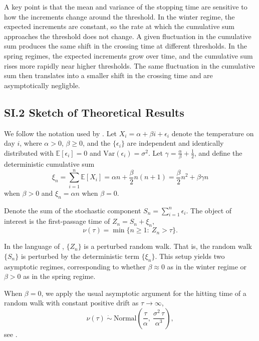\documentclass[12pt,letterpaper]{article}
\begin{document}
A key point is that the mean and variance of the stopping time are sensitive to how the increments change around the threshold. In the winter regime, the expected increments are constant, so the rate at which the cumulative sum approaches the threshold does not change. A given fluctuation in the cumulative sum produces the same shift in the crossing time at different thresholds. In the spring regimes, the expected increments grow over time, and the cumulative sum rises more rapidly near higher thresholds. The same fluctuation in the cumulative sum then translates into a smaller shift in the crossing time and are asymptotically negligble.


\subsection*{SI.2 Sketch of Theoretical
Results}\label{si-sketch-of-theoretical-results}

We follow the notation used by \citet{gut2009stopped}. Let
\(X_i=\alpha+\beta i + \epsilon_i\) denote the temperature on day \(i\),
where \(\alpha>0\), \(\beta\ge 0\), and the \( \{\epsilon_i\} \) are 
independent and identically distributed with  
\(\mathbb{E}[\epsilon_i]=0\) and 
\(\mathrm{Var}(\epsilon_i)=\sigma^2\). Let \(\gamma=\frac{\alpha}{\beta}+\frac{1}{2}\), and
define the deterministic
cumulative sum \[
\xi_n=\sum_{i=1}^n \mathbb{E}[X_i]
=
\alpha n+\frac{\beta}{2}n(n+1)
=
\frac{\beta}{2}n^2+\beta\gamma n\]
when \(\beta>0\) and \(\xi_n=\alpha n\) when \(\beta=0\). 

Denote the sum of the
stochastic component \(S_n=\sum_{i=1}^n \epsilon_i\). The object of
interest is the first-passage time of \( Z_n=S_n+\xi_n\), \[
\nu(\tau)=\min\{n\ge 1:\ Z_n> \tau\}.
\] 

In the language of \citet{lai1977nonlinear}, \(\{Z_n\}\) is a
perturbed random walk. That is, the random walk \(\{S_n\}\) is perturbed by the
deterministic term \(\{\xi_n\}\). This setup yields two
asymptotic regimes, corresponding to whether \(\beta\approx 0\) as in the winter regime or 
\(\beta>0\) as in the spring regime.

When \(\beta=0\), we apply the usual asymptotic argument for
the hitting time of a random walk with constant positive drift as \(\tau \to \infty\), \[
\nu(\tau)\ \dot{\sim}\ \mathrm{Normal}\!\left(\frac{\tau}{\alpha},\ \frac{\sigma^2\,\tau}{\alpha^{3}}\right),
\] see \cite{gut2009stopped}.
\end{document}
